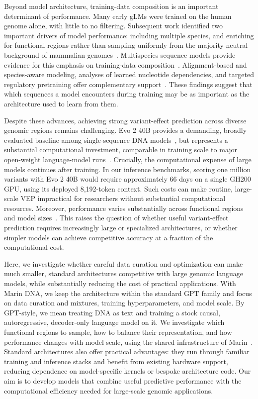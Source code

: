 \documentclass[a4paper,num-refs]{oup-contemporary}
\begin{document}
Beyond model architecture, training-data composition is an important
determinant of performance. Many early gLMs were trained on the human genome
alone, with little to no filtering. Subsequent work identified two important
drivers of model performance: including multiple species, and enriching for
functional regions rather than sampling uniformly from the majority-neutral
background of mammalian genomes~\citep{benegas2025review}. Multispecies
sequence models provide evidence for this emphasis on training-data
composition~\citep{benegas2023dna,zhai2025plantcaduceus,zhai2026plantcad2,%
chao2025shorkie}.
Alignment-based and species-aware modeling, analyses of learned nucleotide
dependencies, and targeted regulatory pretraining offer complementary
support~\citep{benegas2025gpnmsa,karollus2024species,%
tomazdasilva2025nucleotide,brixi2026evo2,patel2026arsenal}.
These findings suggest that which sequences a model encounters during training
may be as important as the architecture used to learn from them.

Despite these advances, achieving strong variant-effect prediction across
diverse genomic regions remains challenging. Evo 2 40B provides a demanding,
broadly evaluated baseline among single-sequence DNA
models~\citep{brixi2026evo2}, but represents a substantial computational
investment, comparable in training scale to major open-weight language-model
runs~\citep{olmo2card,llama31card}. Crucially, the computational expense of
large models continues after training. In our inference benchmarks, scoring
one million variants with Evo 2 40B would require approximately 66 days on
a single GH200 GPU, using its deployed 8,192-token context. Such costs can
make routine, large-scale VEP impractical for researchers without substantial
computational resources. Moreover, performance varies substantially across
functional regions and model sizes~\citep{benegas2025traitgym}. This raises
the question of whether useful variant-effect prediction requires increasingly
large or specialized architectures, or whether simpler models can achieve
competitive accuracy at a fraction of the computational cost.

Here, we investigate whether careful data curation and optimization can make
much smaller, standard architectures competitive with large genomic language
models, while substantially reducing the cost of practical applications.
With Marin DNA, we keep the architecture within the standard GPT family and
focus on data curation and mixtures, training hyperparameters, and model scale.
By GPT-style, we mean treating DNA as text and training a stock causal,
autoregressive, decoder-only language model on it. We investigate which
functional regions to sample, how to balance their representation, and how
performance changes with model scale, using the shared infrastructure of
Marin~\citep{marin}. Standard architectures also offer practical advantages:
they run through familiar training and inference stacks and benefit from
existing hardware support, reducing dependence on model-specific kernels or
bespoke architecture code. Our aim is to develop models that combine useful
predictive performance with the computational efficiency needed for
large-scale genomic applications.
\end{document}
